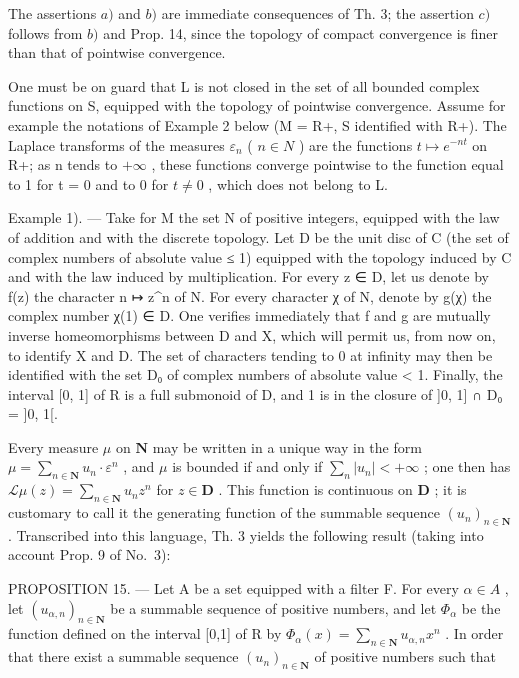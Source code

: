 The assertions \(a)\) and \(b)\) are immediate consequences of Th. 3; the assertion \(c)\) follows from \(b)\) and Prop. 14, since the topology of compact convergence is finer than that of pointwise convergence.

One must be on guard that L is not closed in the set of all bounded complex functions on S, equipped with the topology of pointwise convergence. Assume for example the notations of Example 2 below (M = R+, S identified with R+). The Laplace transforms of the measures \(\varepsilon_{n}\) ( \(n \in N\) ) are the functions \(t \mapsto e^{-nt}\) on R+; as n tends to \(+\infty\) , these functions converge pointwise to the function equal to 1 for t = 0 and to 0 for \(t \neq 0\) , which does not belong to L.

Example 1). --- Take for M the set N of positive integers, equipped with the law of addition and with the discrete topology. Let D be the unit disc of C (the set of complex numbers of absolute value ≤ 1) equipped with the topology induced by C and with the law induced by multiplication. For every z ∈ D, let us denote by f(z) the character n ↦ z\^{}n of N. For every character χ of N, denote by g(χ) the complex number χ(1) ∈ D. One verifies immediately that f and g are mutually inverse homeomorphisms between D and X, which will permit us, from now on, to identify X and D. The set of characters tending to 0 at infinity may then be identified with the set D₀ of complex numbers of absolute value \textless{} 1. Finally, the interval {[}0, 1{]} of R is a full submonoid of D, and 1 is in the closure of {]}0, 1{]} ∩ D₀ = {]}0, 1{[}.

Every measure \(\mu\) on \(\mathbf{N}\) may be written in a unique way in the form \(\mu = \sum_{n\in \mathbf{N}}u_n\cdot \varepsilon^n\) , and \(\mu\) is bounded if and only if \(\sum_{n}|u_n| < +\infty\) ; one then has \(\mathcal{L}\mu (z) = \sum_{n\in \mathbf{N}}u_nz^n\) for \(z\in \mathbf{D}\) . This function is continuous on \(\mathbf{D}\) ; it is customary to call it the generating function of the summable sequence \((u_n)_{n\in \mathbf{N}}\) . Transcribed into this language, Th. 3 yields the following result (taking into account Prop. 9 of No.~3):

PROPOSITION 15. --- Let A be a set equipped with a filter F. For every \(\alpha\in A\) , let \((u_{\alpha,n})_{n\in\mathbf{N}}\) be a summable sequence of positive numbers, and let \(\Phi_{\alpha}\) be the function defined on the interval {[}0,1{]} of R by \(\Phi_{\alpha}(x)=\sum_{n\in\mathbf{N}}u_{\alpha,n}x^{n}\) . In order that there exist a summable sequence \((u_{n})_{n\in\mathbf{N}}\) of positive numbers such that

